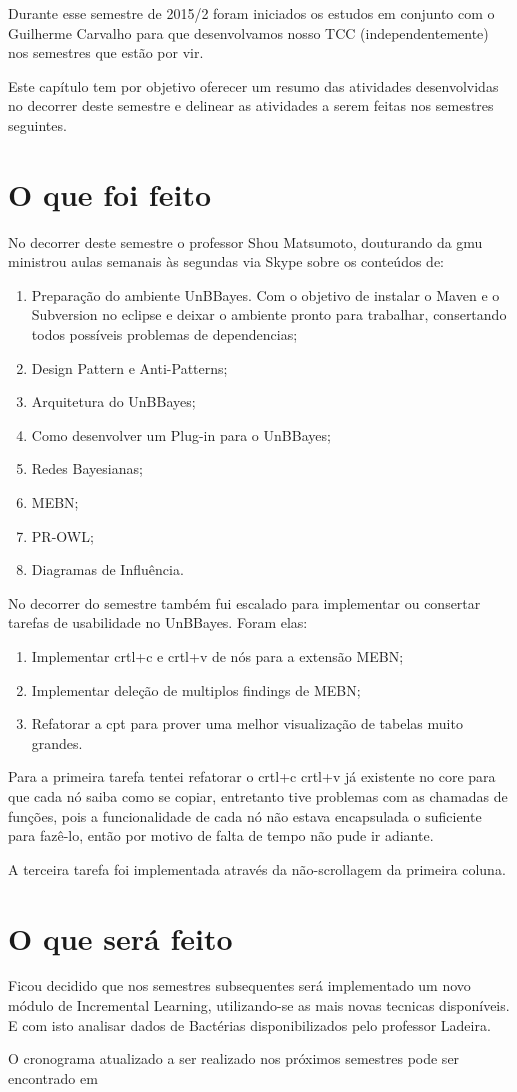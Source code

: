 Durante esse semestre de 2015/2 foram iniciados os estudos em conjunto com o Guilherme Carvalho para que desenvolvamos nosso TCC (independentemente) nos semestres que estão por vir.

Este capítulo tem por objetivo oferecer um resumo das atividades desenvolvidas no decorrer deste semestre e delinear as atividades a serem feitas nos semestres seguintes. 

\section{O que foi feito}
No decorrer deste semestre o professor Shou Matsumoto, douturando da \gls{gmu} ministrou aulas semanais às segundas via Skype sobre os conteúdos de: 

\begin{enumerate}
	\item Preparação do ambiente UnBBayes. Com o objetivo de instalar o Maven e o Subversion no eclipse e deixar o ambiente pronto para trabalhar, consertando todos possíveis problemas de dependencias;
	\item Design Pattern e Anti-Patterns;
	\item Arquitetura do UnBBayes;
	\item Como desenvolver um Plug-in para o UnBBayes;
	\item Redes Bayesianas;
	\item MEBN;
	\item PR-OWL;
	\item Diagramas de Influência.
\end{enumerate}

No decorrer do semestre também fui escalado para implementar ou consertar tarefas de usabilidade no UnBBayes. Foram elas:
\begin{enumerate}
	\item Implementar crtl+c e crtl+v de nós para a extensão MEBN;
	\item Implementar deleção de multiplos findings de MEBN;
	\item Refatorar a \gls{cpt} para prover uma melhor visualização de tabelas muito grandes.
\end{enumerate}

Para a primeira tarefa tentei refatorar o crtl+c crtl+v já existente no core para que cada nó saiba como se copiar, entretanto tive problemas com as chamadas de funções, pois a funcionalidade de cada nó não estava encapsulada o suficiente para fazê-lo, então por motivo de falta de tempo não pude ir adiante.

A terceira tarefa foi implementada através da não-scrollagem da primeira coluna.

\section{O que será feito}
Ficou decidido que nos semestres subsequentes será implementado um novo módulo de Incremental Learning, utilizando-se as mais novas tecnicas disponíveis. E com isto analisar dados de Bactérias disponibilizados pelo professor Ladeira.

O cronograma atualizado a ser realizado nos próximos semestres pode ser encontrado em \cite{cronograma}